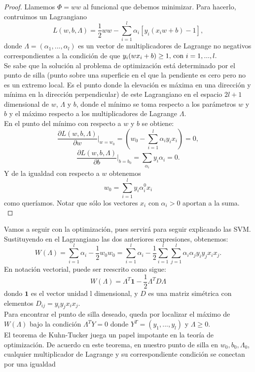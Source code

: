 \begin{proof}
Llamemos $\Phi=ww$ al funcional que debemos minimizar. Para hacerlo, contruimos un Lagrangiano
\[ L(w,b,\Lambda) = \frac{1}{2}ww - \sum_{i=1}^l \alpha_i[y_i(x_iw+b)-1], \]
donde $\Lambda=(\alpha_1,...,\alpha_l)$ es un vector de multiplicadores de Lagrange no negativos correspondientes a la condición de que $y_i(wx_i+b) \geq 1 \textnormal{, con } i=1,...,l.$\\
Se sabe que la solución al problema de optimización está determinado por el punto de silla (punto sobre una superficie en el que la pendiente es cero pero no es un extremo local. Es el punto donde la elevación es máxima en una dirección y mínima en la dirección perpendicular) de este Lagrangiano en el espacio $2l +1$ dimensional de $w$, $\Lambda$ y $b$, donde el mínimo se toma respecto a los parámetros $w$ y $b$ y el máximo respecto a los multiplicadores de Lagrange $\Lambda$.\\
En el punto del mínimo con respecto a $w$ y $b$ se obtiene:
\[ \frac{\partial L(w,b,\Lambda)}{\partial w} \Big|_{w=w_0} = \left( w_0 - \sum_{i=1}^l \alpha_i y_i x_i \right)=0, \]
\[ \frac{\partial L(w,b,\Lambda)}{\partial b} \Big|_{b=b_0} = \sum_{\alpha_i}y_i\alpha_i = 0. \]
Y de la igualdad con respecto a $w$ obtenemos 
\[ w_0= \sum_{i=1}^l y_i \alpha_i^0 x_i \]
como queríamos. Notar que sólo los vectores $x_i$ con $\alpha_i >0$ aportan a la suma.\\
\end{proof}
Vamos a seguir con la optimización, pues servirá para seguir explicando las SVM.\\
Sustituyendo en el Lagrangiano las dos anteriores expresiones, obtenemos:
\[ W(\Lambda)=\sum_{i=1}^l \alpha_i - \frac{1}{2}w_0w_0= \sum_{i=1}^l \alpha_i - \frac{1}{2}\sum_{i=1}^l\sum_{j=1}^l \alpha_i \alpha_j y_i y_j x_i x_j. \]
En notación vectorial, puede ser reescrito como sigue:
\[ W(\Lambda)= \Lambda^T\textbf{1}-\frac{1}{2}\Lambda^TD\Lambda \]
dondo $\textbf{1}$ es el vector unidad l dimensional, y $D$ es una matriz simétrica con elementos $D_{ij}=y_iy_jx_ix_j$.\\
Para encontrar el punto de silla deseado, queda por localizar el máximo de $W(\Lambda)$ bajo la condición $\Lambda^TY=0$ donde $Y^T=(y_1,...,y_l)$ y $\Lambda \geq 0$.\\
El teorema de Kuhn-Tucker juega un papel impotante en la teoría de optimización. De acuerdo cn este teorema, en nuestro punto de silla en $w_0,b_0,\Lambda_0$, cualquier multiplicador de Lagrange y su correspondiente condición se conectan por una igualdad
